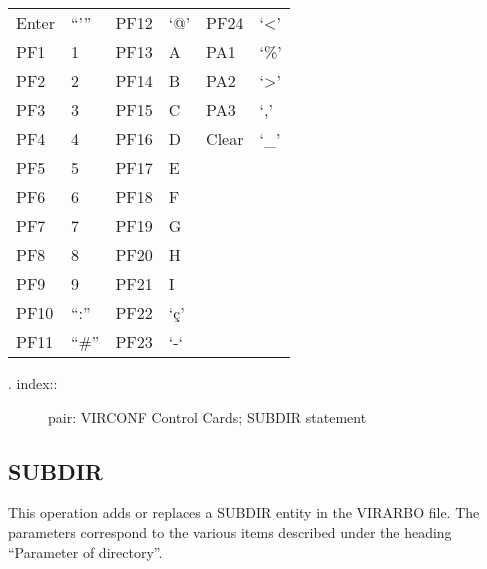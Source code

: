 \documentclass[letterpaper,10pt,english]{sphinxmanual}
\begin{document}
\begin{savenotes}\sphinxattablestart
\centering
\begin{tabulary}{\linewidth}[t]{|T|T|T|T|T|T|}
\hline
{}\relax &\relax &\relax &\relax &\relax &\relax \\
\hline
Enter
&
“’”
&
PF12
&
‘@’
&
PF24
&
‘\textless{}’
\\
\hline
PF1
&
1
&
PF13
&
A
&
PA1
&
‘\%’
\\
\hline
PF2
&
2
&
PF14
&
B
&
PA2
&
‘\textgreater{}’
\\
\hline
PF3
&
3
&
PF15
&
C
&
PA3
&
‘,’
\\
\hline
PF4
&
4
&
PF16
&
D
&
Clear
&
‘\_’
\\
\hline
PF5
&
5
&
PF17
&
E
&&\\
\hline
PF6
&
6
&
PF18
&
F
&&\\
\hline
PF7
&
7
&
PF19
&
G
&&\\
\hline
PF8
&
8
&
PF20
&
H
&&\\
\hline
PF9
&
9
&
PF21
&
I
&&\\
\hline
PF10
&
“:”
&
PF22
&
‘ç’
&&\\
\hline
PF11
&
“\#”
&
PF23
&
‘-‘
&&\\
\hline
\end{tabulary}
\par
\sphinxattableend\end{savenotes}
\begin{description}
\item[{. index::}] \leavevmode
pair: VIRCONF Control Cards; SUBDIR statement

\end{description}


\subsection{SUBDIR}
\label{\detokenize{Installation_Guide:subdir}}
This operation adds or replaces a SUBDIR entity in the VIRARBO file. The parameters correspond to the various items described under the heading “Parameter of directory”.
\end{document}
